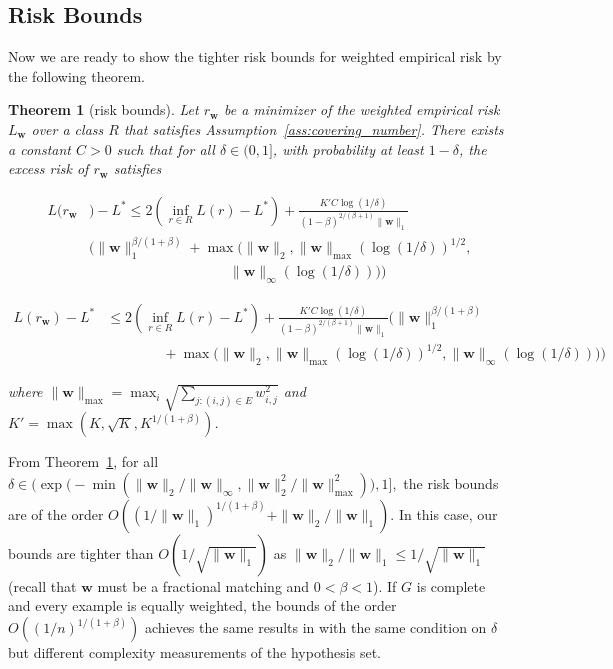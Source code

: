 \documentclass[letterpaper]{article} %
\def\DoubleColumn{}
\def\DoubleColumnEnd{}
\def\SingleColumn{}
\def\SingleColumnEnd{}
\newtheorem{theorem}{Theorem}
\newcommand{\weight}{\mathbf{w}}
\newcommand{\bayeserror}{L^*}
\newcommand{\empiricalrisk}[1]{L_{#1}}
\newcommand{\risk}{L}
\newcommand{\pair}[1]{(#1)}
\newcommand{\normo}[1]{\|#1\|_1}
\newcommand{\complexbound}{\beta}
\begin{document}
\subsection{Risk Bounds} %
\label{sub:risk_bounds}
Now we are ready to show the tighter risk bounds for weighted empirical risk by the following theorem.
\begin{theorem}[risk bounds]
    \label{th:main_theorem}
    Let $r_\weight{}$ be a minimizer of the weighted empirical risk $\empiricalrisk{\weight{}}$ over a class $R$ that satisfies Assumption~\ref{ass:covering_number}. There exists a constant $C>0$ such that for all $\delta\in(0,1]$, with probability at least $1-\delta$, the excess risk of $r_\weight{}$ satisfies
    \DoubleColumn
    \begin{equation}
        \begin{aligned}
            \label{eq:main_result}
            \risk(r_\weight{}&)-\bayeserror \le 2(\inf_{r\in R}\risk(r)-\bayeserror) + \frac{K'C\log(1/\delta)}{(1-\complexbound)^{2/(\complexbound+1)}\normo{\weight{}}}\\
            &\Bigg(\normo{\weight{}}^{\complexbound/(1+\complexbound)}+\max\Big(\|\weight{}\|_2,\|\weight{}\|_{\max}(\log(1/\delta))^{1/2},\\
            &\qquad\qquad\qquad\qquad\qquad\|\weight{}\|_\infty(\log(1/\delta))\Big)\Bigg)
        \end{aligned}
    \end{equation}
    \DoubleColumnEnd
    \SingleColumn
    \begin{equation}
        \begin{aligned}
            \label{eq:main_result}
            \risk(r_\weight{})-\bayeserror &\le 2(\inf_{r\in R}\risk(r)-\bayeserror) + \frac{K'C\log(1/\delta)}{(1-\complexbound)^{2/(\complexbound+1)}\normo{\weight{}}}\Bigg(\normo{\weight{}}^{\complexbound/(1+\complexbound)}\\
            &\qquad\qquad+\max\Big(\|\weight{}\|_2,\|\weight{}\|_{\max}(\log(1/\delta))^{1/2},\|\weight{}\|_\infty(\log(1/\delta))\Big)\Bigg)
        \end{aligned}
    \end{equation}
    \SingleColumnEnd
    where $\|\weight{}\|_{\max}=\max_i \sqrt{\sum_{j:\pair{i,j}\in E} w_{i,j}^2}$ and $K'=\max(K,\sqrt{K},K^{1/(1+\complexbound{})})$.
\end{theorem}


From Theorem~\ref{th:main_theorem}, for all
$\delta\in\Bigg(\exp\Big(-\min(\|\weight{}\|_2/\|\weight{}\|_\infty,\|\weight{}\|_2^2/\|\weight{}\|_\max^2)\Big),1\Bigg],$ the risk bounds are of the order
$O\left((1/\normo{\weight{}})^{1/(1+\complexbound)}+\|\weight{}\|_2/\normo{\weight{}}\right).$ 
In this case, our bounds are tighter than $O(1/\sqrt{\normo{\weight{}}})$ as $\|\weight\|_2/\normo{\weight}\le 1/\sqrt{\normo{\weight}}$ (recall that $\weight{}$ must be a fractional matching and $0<\complexbound{}<1$).
If $G$ is complete and every example is equally weighted, 
the bounds of the order $O((1/n)^{1/(1+\complexbound)})$ achieves the same results in \cite{papa2016graph} with the same condition on $\delta$ but different complexity measurements of the hypothesis set.
\end{document}
